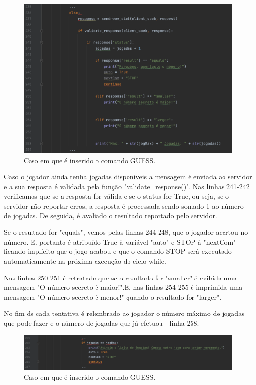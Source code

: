 \documentclass{report}
\begin{document}
\begin{figure}[H]
        \centering
        \includegraphics[scale=0.43]{guess3}      
        \caption{Caso em que é inserido o comando GUESS.}
\end{figure}
Caso o jogador ainda tenha jogadas disponíveis a mensagem é enviada ao servidor e a sua resposta é validada pela função "validate\_response()".
Nas linhas 241-242 verificamos que se a resposta for válida e se o status for True, ou seja, se o servidor não reportar erros, a resposta é processada sendo somado 1 ao número de jogadas. De seguida, é avaliado o resultado reportado pelo servidor.

Se o resultado for "equals", vemos pelas linhas 244-248, que o jogador acertou no número. E, portanto é atribuído True à variável "auto" e STOP à "nextCom" ficando implícito que o jogo acabou e que o comando STOP será executado automaticamente na próxima execução do ciclo while.

Nas linhas 250-251 é retratado que se o resultado for "smaller" é exibida uma mensagem "O número secreto é maior!".E, nas linhas 254-255 é imprimida uma mensagem "O número secreto é menor!" quando o resultado for "larger".

No fim de cada tentativa é relembrado ao jogador o número máximo de jogadas que pode fazer e o número de jogadas que já efetuou - linha 258.

\begin{figure}[H]
        \centering
        \includegraphics[scale=0.43]{guess4}      
        \caption{Caso em que é inserido o comando GUESS.}
\end{figure}
\end{document}
